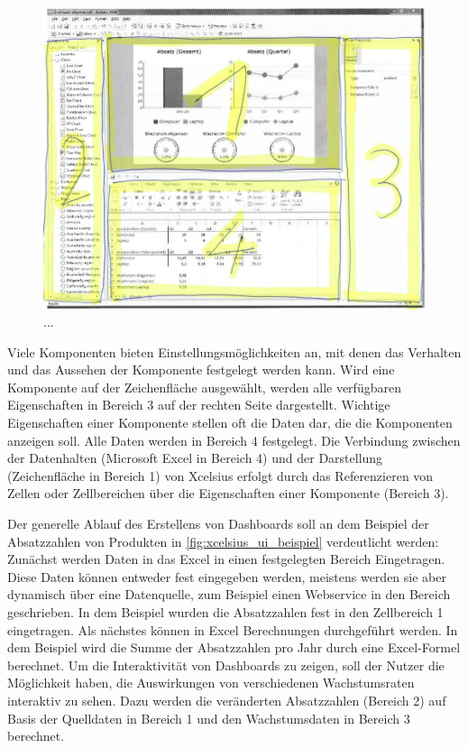 \begin{onehalfspacing}
\begin{figure}[h]
\centering
\setlength{\unitlength}{1mm}
\includegraphics[width=15cm]{images/Xcelsius_UI_Aufbau.jpg}
\caption{... \label{fig:xcelsius_ui_aufbau}}
\end{figure} 

Viele Komponenten bieten Einstellungsmöglichkeiten an, mit denen das Verhalten und das Aussehen der Komponente festgelegt werden kann. Wird eine Komponente auf der Zeichenfläche ausgewählt, werden alle verfügbaren Eigenschaften in Bereich 3 auf der rechten Seite dargestellt. Wichtige Eigenschaften einer Komponente stellen oft die Daten dar, die die Komponenten anzeigen soll. Alle Daten werden in Bereich 4 festgelegt. Die Verbindung zwischen der Datenhalten (Microsoft Excel in Bereich 4) und der Darstellung (Zeichenfläche in Bereich 1) von \gls{Xcelsius} erfolgt durch das Referenzieren von Zellen oder Zellbereichen über die Eigenschaften einer Komponente (Bereich 3).

Der generelle Ablauf des Erstellens von Dashboards soll an dem Beispiel der Absatzzahlen von Produkten in \vref{fig:xcelsius_ui_beispiel} verdeutlicht werden: Zunächst werden Daten in das Excel in einen festgelegten Bereich Eingetragen. Diese Daten können entweder fest eingegeben werden, meistens werden sie aber dynamisch über eine Datenquelle, zum Beispiel einen Webservice in den Bereich geschrieben. In dem Beispiel wurden die Absatzzahlen fest in den Zellbereich 1 eingetragen. Als nächstes können in Excel Berechnungen durchgeführt werden. In dem Beispiel wird die Summe der Absatzzahlen pro Jahr durch eine Excel-Formel berechnet. Um die Interaktivität von Dashboards zu zeigen, soll der Nutzer die Möglichkeit haben, die Auswirkungen von verschiedenen Wachstumsraten interaktiv zu sehen. Dazu werden die veränderten Absatzzahlen (Bereich 2) auf Basis der Quelldaten in Bereich 1 und den Wachstumsdaten in Bereich 3 berechnet.


\end{onehalfspacing}
